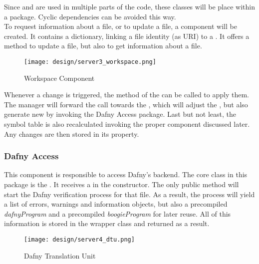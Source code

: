Since  and  are used in multiple parts of the code, these classes will be place within a  package.
Cyclic dependencies can be avoided this way.\\

To request information about a file, or to update a file, a component  will be created.
It contains a dictionary, linking a file identity (as URI) to a .
It offers a method to update a file, but also to get information about a file.\\

\begin{figure}[ht]
    \centering
    \texttt{[image: design/server3\_workspace.png]}
    \caption{Workspace Component}
    \label{fig:server_workspace}
\end{figure}

Whenever a change is triggered, the  method of the  can be called to apply them.
The manager will forward the call towards the , which will adjust the ,
but also generate new  by invoking the Dafny Access package.
Last but not least, the symbol table is also recalculated invoking the proper component discussed later.
Any changes are then stored in its  property.\\

\subsubsection{Dafny Access}
This component is responsible to access Dafny's backend.
The core class in this package is the \linebreak {}.
It receives a  in the constructor.
The only public method  will start the Dafny verification process for that file.
As a result, the process will yield a list of errors, warnings and information objects, but also a precompiled \textit{dafnyProgram} and a precompiled \textit{boogieProgram} for later reuse.
All of this information is stored in the  wrapper class and returned as a result.\\

\begin{figure}[H]
    \centering
    \texttt{[image: design/server4\_dtu.png]}
    \caption{Dafny Translation Unit}
    \label{fig:server_dtu}
\end{figure}


